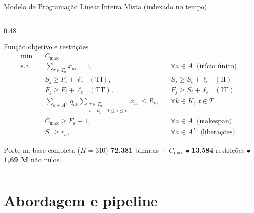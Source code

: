 \documentclass[aspectratio=169]{beamer}
\begin{document}
\begin{frame}{Modelo de Programação Linear Inteira Mista (indexado no tempo)}
\begin{columns}[T,onlytextwidth]
\begin{column}{0.48\textwidth}
\begin{block}{Função objetivo e restrições}
\fontsize{6.6pt}{7.8pt}\selectfont
\setlength{\jot}{1.5pt}
\vspace{-0.26cm}
\begin{align*}
\min\quad & C_{\max} \\
\text{s.a.}\quad
& \sum_{\tau \in T_a} x_{a\tau} = 1, && \forall a \in A \;\; \text{(início único)} \\
& S_j \ge F_i + \ell_e \;\; (\text{TI}), && S_j \ge S_i + \ell_e \;\; (\text{II}) \\
& F_j \ge F_i + \ell_e \;\; (\text{TT}), && F_j \ge S_i + \ell_e \;\; (\text{IT}) \\
& \sum_{a \in A^+} q_{ak} \!\!\!\sum_{\substack{\tau \in T_a \\ t-d_a+1 \le \tau \le t}}\!\!\! x_{a\tau} \le R_k, && \forall k \in K,\; t \in T \\
& C_{\max} \ge F_a + 1, && \forall a \in A \;\; \text{(makespan)} \\
& S_a \ge r_a, && \forall a \in A^L \;\; \text{(liberações)}
\end{align*}
\end{block}

\vspace{0.08cm}

\begin{block}{Porte na base completa ($H = 310$)}
\fontsize{6.5pt}{7.8pt}\selectfont
\textbf{72.381} binárias + $C_{\max}$ \;\;$\bullet$\;\; \textbf{13.584} restrições \;\;$\bullet$\;\; \textbf{1,69 M} não nulos.
\end{block}
\end{column}

\end{columns}

\end{frame}

\section{Abordagem e pipeline}
\end{document}

